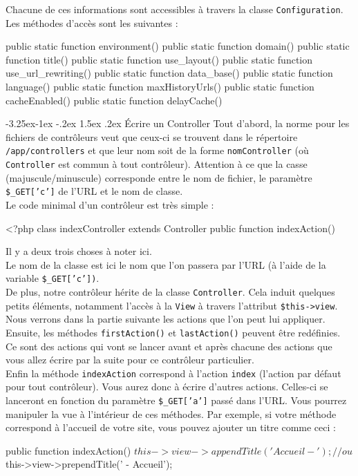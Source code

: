 \documentclass[a4paper,11pt]{article}
\makeatletter
\renewcommand{\subsection}{\@startsection{subsection}{2}{\z@}%
             {-3.25ex\@plus -1ex \@minus -.2ex}%
             {1.5ex \@plus .2ex}%
             {\color{bleuFonce}\normalfont\large\bfseries}}
\makeatother
\begin{document}
Chacune de ces informations sont accessibles à travers la classe \texttt{Configuration}. Les méthodes d'accès sont les suivantes :
\begin{PHP}
public static function environment()
public static function domain()
public static function title()
public static function use_layout()
public static function use_url_rewriting()
public static function data_base()
public static function language()
public static function maxHistoryUrls()
public static function cacheEnabled()
public static function delayCache()
\end{PHP}

\subsection{Écrire un Controller}
Tout d'abord, la norme pour les fichiers de contrôleurs veut que ceux-ci se trouvent dans le répertoire \texttt{/app/controllers} et que leur nom soit de la forme \texttt{nomController} (où \texttt{Controller} est commun à tout contrôleur). Attention à ce que la casse (majuscule/minuscule) corresponde entre le nom de fichier, le paramètre \texttt{\$\_GET['c']} de l'URL et le nom de classe.\\

Le code minimal d'un contrôleur est très simple :
\begin{PHP}
<?php   
class indexController extends Controller {
  public function indexAction() {}
}
\end{PHP}

Il y a deux trois choses à noter ici.\\

Le nom de la classe est ici le nom que l'on passera par l'URL (à l'aide de la variable \texttt{\$\_GET['c'])}.\\

De plus, notre contrôleur hérite de la classe \texttt{Controller}. Cela induit quelques petits éléments, notamment l'accès à la \texttt{View} à travers l'attribut \texttt{\$this->view}. Nous verrons dans la partie suivante les actions que l'on peut lui appliquer. Ensuite, les méthodes \texttt{firstAction()} et \texttt{lastAction()} peuvent être redéfinies. Ce sont des actions qui vont se lancer avant et après chacune des actions que vous allez écrire par la suite pour ce contrôleur particulier.\\

Enfin la méthode \texttt{indexAction} correspond à l'action \texttt{index} (l'action par défaut pour tout contrôleur). Vous aurez donc à écrire d'autres actions. Celles-ci se lanceront en fonction du paramètre \texttt{\$\_GET['a']} passé dans l'URL. Vous pourrez manipuler la vue à l'intérieur de ces méthodes. Par exemple, si votre méthode correspond à l'accueil de votre site, vous pouvez ajouter un titre comme ceci :
\begin{PHP}
public function indexAction() {
  $this->view->appendTitle('Accueil - ');
  // ou
  $this->view->prependTitle(' - Accueil');
}
\end{PHP}
\end{document}
